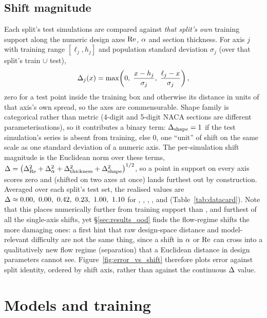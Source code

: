 \subsection{Shift magnitude}
Each split's test simulations are compared against \emph{that split's own}
training support along the numeric design axes $\mathrm{Re}$, $\alpha$ and section
thickness. For axis $j$ with training range $[\ell_j, h_j]$ and population
standard deviation $\sigma_j$ (over that split's train $\cup$ test),
\begin{equation}
  \Delta_j(x) = \max\!\left(0,\; \frac{x - h_j}{\sigma_j},\; \frac{\ell_j - x}{\sigma_j}\right),
\end{equation}
zero for a test point inside the training box and otherwise its distance in
units of that axis's own spread, so the axes are commensurable. Shape family is
categorical rather than metric (4-digit and 5-digit NACA sections are different
parameterisations), so it contributes a binary term: $\Delta_{\text{shape}} = 1$
if the test simulation's series is absent from training, else $0$, one ``unit''
of shift on the same scale as one standard deviation of a numeric axis. The
per-simulation shift magnitude is the Euclidean norm over these terms,
$\Delta = \big(\Delta_{\mathrm{Re}}^2 + \Delta_{\alpha}^2 + \Delta_{\text{thickness}}^2 +
\Delta_{\text{shape}}^2\big)^{1/2}$, so a point in support on every axis scores
zero and  (shifted on two axes at once) lands
furthest out by construction. Averaged over each split's test set, the realised
values are $\shift \approx 0.00,\ 0.00,\ 0.42,\ 0.23,\ 1.00,\ 1.10$ for
, , , ,
 and  (Table~\ref{tab:datacard}). Note
that this places  numerically further from training support
than , and  furthest of all the single-axis
shifts, yet \S\ref{sec:results_ood} finds the flow-regime shifts the more
damaging ones: a first hint that raw design-space distance and model-relevant
difficulty are not the same thing, since a shift in $\alpha$ or $\mathrm{Re}$ can cross
into a qualitatively new flow regime (separation) that a Euclidean distance in
design parameters cannot see. Figure~\ref{fig:error_vs_shift} therefore plots
error against split identity, ordered by shift axis, rather than against the
continuous $\Delta$ value.

\section{Models and training}
\label{sec:models}

